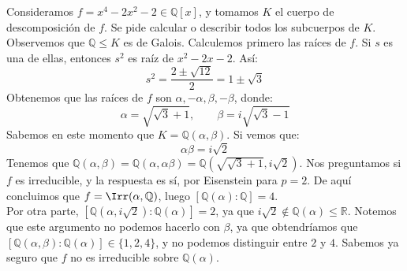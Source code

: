 \begin{ejemplo}
    Consideramos $f = x^4-2x^2-2\in \mathbb{Q}[x]$, y tomamos $K$ el cuerpo de descomposición de $f$. Se pide calcular o describir todos los subcuerpos de $K$.\\

    \noindent
    Observemos que $\mathbb{Q}\leq K$ es de Galois. Calculemos primero las raíces de $f$. Si $s$ es una de ellas, entonces $s^2$ es raíz de $x^2-2x-2$. Así:
    \begin{equation*}
        s^2 = \frac{2\pm \sqrt{12}}{2} = 1\pm \sqrt{3}
    \end{equation*}
    Obtenemos que las raíces de $f$ son $\alpha,-\alpha,\beta,-\beta$, donde:
    \begin{equation*}
        \alpha = \sqrt{\sqrt{3}+1}, \qquad \beta = i\sqrt{\sqrt{3}-1}
    \end{equation*}
    Sabemos en este momento que $K = \mathbb{Q}(\alpha,\beta)$. Si vemos que:
    \begin{equation*}
        \alpha\beta = i\sqrt{2}
    \end{equation*}
    Tenemos que $\mathbb{Q}(\alpha,\beta) = \mathbb{Q}(\alpha,\alpha\beta) = \mathbb{Q}\left(\sqrt{\sqrt{3}+1}, i\sqrt{2}\right)$. Nos preguntamos si $f$ es irreducible, y la respuesta es sí, por Eisenstein para $p=2$. De aquí concluimos que $f = \Irr(\alpha,\mathbb{Q})$, luego $[\mathbb{Q}(\alpha):\mathbb{Q}] = 4$.\\

    \noindent
    Por otra parte, $\left[\mathbb{Q}\left(\alpha,i\sqrt{2}\right):\mathbb{Q}(\alpha)\right] = 2$, ya que $i\sqrt{2}\notin \mathbb{Q}(\alpha)\leq \mathbb{R}$. Notemos que este argumento no podemos hacerlo con $\beta$, ya que obtendríamos que $[\mathbb{Q}(\alpha,\beta):\mathbb{Q}(\alpha)] \in \{1,2,4\}$, y no podemos distinguir entre $2$ y $4$. Sabemos ya seguro que $f$ no es irreducible sobre $\mathbb{Q}(\alpha)$.\\


\end{ejemplo}

